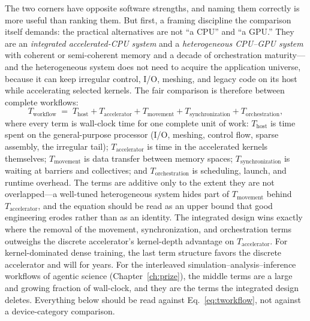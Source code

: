 The two corners have opposite software strengths, and naming them correctly is more useful than ranking them. But first, a framing discipline the comparison itself demands: the practical alternatives are not ``a CPU'' and ``a GPU.'' They are an \emph{integrated accelerated-CPU system} and a \emph{heterogeneous CPU--GPU system} with coherent or semi-coherent memory and a decade of orchestration maturity---and the heterogeneous system does not need to acquire the application universe, because it can keep irregular control, I/O, meshing, and legacy code on its host while accelerating selected kernels. The fair comparison is therefore between complete workflows:
\begin{equation}
T_{\mathrm{workflow}} \;=\; T_{\mathrm{host}} + T_{\mathrm{accelerator}} + T_{\mathrm{movement}} + T_{\mathrm{synchronization}} + T_{\mathrm{orchestration}},
\label{eq:tworkflow}
\end{equation}
where every term is wall-clock time for one complete unit of work: $T_{\mathrm{host}}$ is time spent on the general-purpose processor (I/O, meshing, control flow, sparse assembly, the irregular tail); $T_{\mathrm{accelerator}}$ is time in the accelerated kernels themselves; $T_{\mathrm{movement}}$ is data transfer between memory spaces; $T_{\mathrm{synchronization}}$ is waiting at barriers and collectives; and $T_{\mathrm{orchestration}}$ is scheduling, launch, and runtime overhead. The terms are additive only to the extent they are not overlapped---a well-tuned heterogeneous system hides part of $T_{\mathrm{movement}}$ behind $T_{\mathrm{accelerator}}$, and the equation should be read as an upper bound that good engineering erodes rather than as an identity.
The integrated design wins exactly where the removal of the movement, synchronization, and orchestration terms outweighs the discrete accelerator's kernel-depth advantage on $T_{\mathrm{accelerator}}$. For kernel-dominated dense training, the last term structure favors the discrete accelerator and will for years. For the interleaved simulation--analysis--inference workflows of agentic science (Chapter~\ref{ch:prize}), the middle terms are a large and growing fraction of wall-clock, and they are the terms the integrated design deletes. Everything below should be read against Eq.~\eqref{eq:tworkflow}, not against a device-category comparison.

